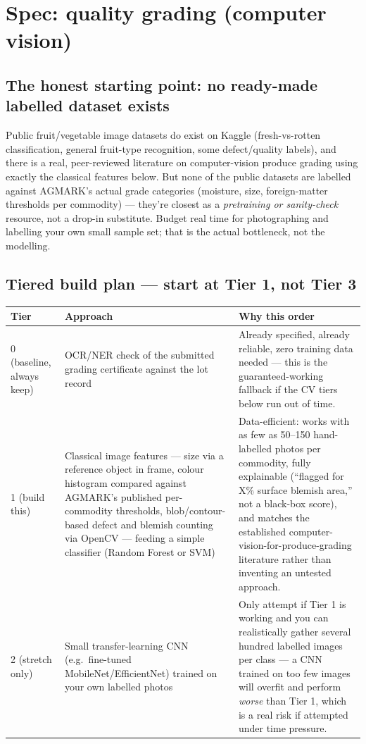 \documentclass[11pt]{article}
\begin{document}
\clearpage
\section{Spec: quality grading (computer vision)}

\subsection*{The honest starting point: no ready-made labelled dataset exists}
Public fruit/vegetable image datasets do exist on Kaggle (fresh-vs-rotten classification, general
fruit-type recognition, some defect/quality labels), and there is a real, peer-reviewed literature on
computer-vision produce grading using exactly the classical features below. But none of the public datasets
are labelled against AGMARK's actual grade categories (moisture, size, foreign-matter thresholds per
commodity) --- they're closest as a \emph{pretraining or sanity-check} resource, not a drop-in substitute.
Budget real time for photographing and labelling your own small sample set; that is the actual bottleneck,
not the modelling.

\subsection*{Tiered build plan --- start at Tier 1, not Tier 3}
\renewcommand{\arraystretch}{1.35}
\noindent\begin{longtable}{@{}p{1.6cm}p{4.4cm}p{6.5cm}@{}}
\toprule
\textbf{Tier} & \textbf{Approach} & \textbf{Why this order} \\
\midrule
\endhead
0 (baseline, always keep) & OCR/NER check of the submitted grading certificate against the lot record &
Already specified, already reliable, zero training data needed --- this is the guaranteed-working fallback
if the CV tiers below run out of time. \\[0.4em]
1 (build this) & Classical image features --- size via a reference object in frame, colour histogram
compared against AGMARK's published per-commodity thresholds, blob/contour-based defect and blemish
counting via OpenCV --- feeding a simple classifier (Random Forest or SVM) & Data-efficient: works with as
few as 50--150 hand-labelled photos per commodity, fully explainable (``flagged for X\% surface blemish
area,'' not a black-box score), and matches the established computer-vision-for-produce-grading literature
rather than inventing an untested approach. \\[0.4em]
2 (stretch only) & Small transfer-learning CNN (e.g.\ fine-tuned MobileNet/EfficientNet) trained on your
own labelled photos & Only attempt if Tier 1 is working and you can realistically gather several hundred
labelled images per class --- a CNN trained on too few images will overfit and perform \emph{worse} than
Tier 1, which is a real risk if attempted under time pressure. \\
\bottomrule
\end{longtable}
\end{document}

